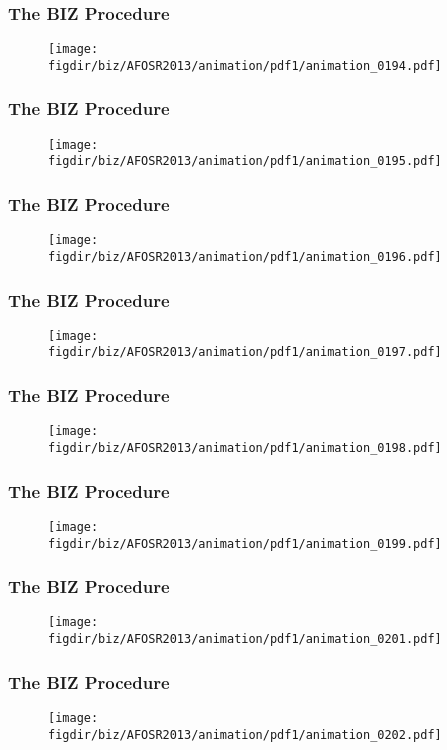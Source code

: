 \documentclass[13pt]{beamer}
\newcommand{\figdir}{../../fig}
\begin{document}
{\begin{frame}\frametitle{The BIZ Procedure}\begin{figure}\texttt{[image: \\figdir/biz/AFOSR2013/animation/pdf1/animation\_0194.pdf]}\end{figure}\end{frame}
\begin{frame}\frametitle{The BIZ Procedure}\begin{figure}\texttt{[image: \\figdir/biz/AFOSR2013/animation/pdf1/animation\_0195.pdf]}\end{figure}\end{frame}
\begin{frame}\frametitle{The BIZ Procedure}\begin{figure}\texttt{[image: \\figdir/biz/AFOSR2013/animation/pdf1/animation\_0196.pdf]}\end{figure}\end{frame}
\begin{frame}\frametitle{The BIZ Procedure}\begin{figure}\texttt{[image: \\figdir/biz/AFOSR2013/animation/pdf1/animation\_0197.pdf]}\end{figure}\end{frame}
\begin{frame}\frametitle{The BIZ Procedure}\begin{figure}\texttt{[image: \\figdir/biz/AFOSR2013/animation/pdf1/animation\_0198.pdf]}\end{figure}\end{frame}
\begin{frame}\frametitle{The BIZ Procedure}\begin{figure}\texttt{[image: \\figdir/biz/AFOSR2013/animation/pdf1/animation\_0199.pdf]}\end{figure}\end{frame}
\begin{frame}\frametitle{The BIZ Procedure}\begin{figure}\texttt{[image: \\figdir/biz/AFOSR2013/animation/pdf1/animation\_0201.pdf]}\end{figure}\end{frame}
\begin{frame}\frametitle{The BIZ Procedure}\begin{figure}\texttt{[image: \\figdir/biz/AFOSR2013/animation/pdf1/animation\_0202.pdf]}\end{figure}\end{frame}
}
\end{document}
